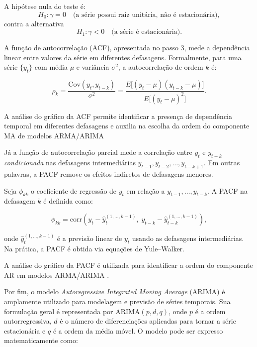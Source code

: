 \documentclass[journal]{IEEEtran}
\begin{document}
A hipótese nula do teste é:
\[
H_0: \gamma = 0 \quad \text{(a série possui raiz unitária, não é estacionária)},
\]
contra a alternativa
\[
H_1: \gamma < 0 \quad \text{(a série é estacionária)}.
\]


A função de autocorrelação (ACF), apresentada no passo 3, mede a dependência linear entre valores da série em diferentes defasagens.
Formalmente, para uma série $\{y_t\}$ com média $\mu$ e variância $\sigma^2$, a autocorrelação de ordem $k$ é:

\]

 \begin{equation}
    \rho_k = \frac{\mathrm{Cov}(y_t, y_{t-k})}{\sigma^2}
= \frac{E\big[(y_t - \mu)(y_{t-k} - \mu)\big]}{E\big[(y_t - \mu)^2\big]}.
    \label{eq:eq-signal}
\end{equation}

A análise do gráfico da ACF permite identificar a presença de dependência temporal
em diferentes defasagens e auxilia na escolha da ordem do componente MA de modelos ARMA/ARIMA

Já a função de autocorrelação parcial mede a correlação entre $y_t$ e $y_{t-k}$ \textit{condicionada}
nas defasagens intermediárias $y_{t-1}, y_{t-2}, \dots, y_{t-k+1}$. Em outras palavras,
a PACF remove os efeitos indiretos de defasagens menores.

Seja $\phi_{kk}$ o coeficiente de regressão de $y_t$ em relação a $y_{t-1}, \dots, y_{t-k}$.
A PACF na defasagem $k$ é definida como:

\]

 \begin{equation}
\phi_{kk} = \text{corr}\left(y_t - \hat{y}_t^{(1,\dots,k-1)}, \; y_{t-k} - \hat{y}_{t-k}^{(1,\dots,k-1)}\right),
    \label{eq:eq-signal}
\end{equation}

onde $\hat{y}_t^{(1,\dots,k-1)}$ é a previsão linear de $y_t$ usando as defasagens intermediárias.
Na prática, a PACF é obtida via equações de Yule--Walker.

A análise do gráfico da PACF é utilizada para identificar a ordem do componente AR em modelos ARMA/ARIMA  \cite{nielsen2019}.

Por fim, o modelo \emph{Autoregressive Integrated Moving Average} (ARIMA) é amplamente utilizado para modelagem e previsão de séries temporais. Sua formulação geral é representada por ARIMA$(p,d,q)$, onde $p$ é a ordem autorregressiva, $d$ é o número de diferenciações aplicadas para tornar a série estacionária e $q$ é a ordem da média móvel. O modelo pode ser expresso matematicamente como:
\end{document}
